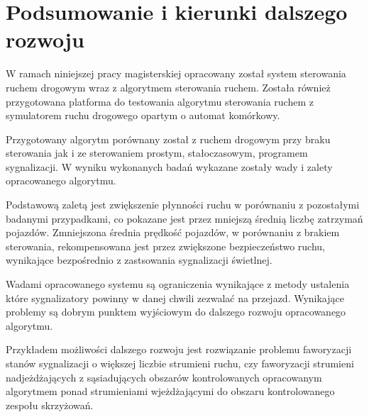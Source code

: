 \chapter{Podsumowanie i kierunki dalszego rozwoju}
W ramach niniejszej pracy magisterskiej opracowany został system sterowania ruchem drogowym wraz z algorytmem sterowania ruchem. Została również przygotowana platforma do testowania algorytmu sterowania ruchem z symulatorem ruchu drogowego opartym o automat komórkowy.

Przygotowany algorytm porównany został z ruchem drogowym przy braku sterowania jak i ze sterowaniem prostym, stałoczasowym, programem sygnalizacji. W wyniku wykonanych badań wykazane zostały wady i zalety opracowanego algorytmu.

Podstawową zaletą jest zwiększenie płynności ruchu w porównaniu z pozostałymi badanymi przypadkami, co pokazane jest przez mniejszą średnią liczbę zatrzymań pojazdów. Zmniejszona średnia prędkość pojazdów, w porównaniu z brakiem sterowania, rekompensowana jest przez zwiększone bezpieczeństwo ruchu, wynikające bezpośrednio z zastsowania sygnalizacji świetlnej.

Wadami opracowanego systemu są ograniczenia wynikające z metody ustalenia które sygnalizatory powinny w danej chwili zezwalać na przejazd. Wynikające problemy są dobrym punktem wyjściowym do dalszego rozwoju opracowanego algorytmu.

Przykładem możliwości dalszego rozwoju jest rozwiązanie problemu faworyzacji stanów sygnalizacji o większej liczbie strumieni ruchu, czy faworyzacji strumieni nadjeżdżających z sąsiadujących obszarów kontrolowanych opracowanym algorytmem ponad strumieniami wjeżdżającymi do obszaru kontrolowanego zespołu skrzyżowań.